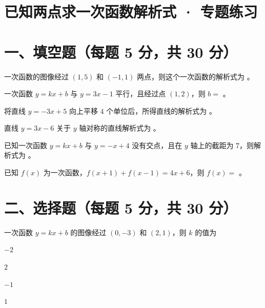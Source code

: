 \documentclass{exam-zh}
\begin{document}
\section*{已知两点求一次函数解析式 · 专题练习}

\section*{一、填空题（每题 5 分，共 30 分）}


\begin{question}[points=5]
  一次函数的图像经过 $(1, 5)$ 和 $(-1, 1)$ 两点，则这个一次函数的解析式为 \fillin。
  \fillin
\end{question}



\begin{question}[points=5]
  一次函数 $y = kx + b$ 与 $y = 3x - 1$ 平行，且经过点 $(1, 2)$，则 $b = $ \fillin。
  \fillin
\end{question}



\begin{question}[points=5]
  将直线 $y = -3x + 5$ 向上平移 $4$ 个单位后，所得直线的解析式为 \fillin。
  \fillin
\end{question}



\begin{question}[points=5]
  直线 $y = 3x - 6$ 关于 $y$ 轴对称的直线解析式为 \fillin。
  \fillin
\end{question}



\begin{question}[points=5]
  已知一次函数 $y = kx + b$ 与 $y = -x + 4$ 没有交点，且在 $y$ 轴上的截距为 $7$，则解析式为 \fillin。
  \fillin
\end{question}



\begin{question}[points=5]
  已知 $f(x)$ 为一次函数，$f(x + 1) + f(x - 1) = 4x + 6$，则 $f(x) = $ \fillin。
  \fillin
\end{question}


\section*{二、选择题（每题 5 分，共 30 分）}


\begin{question}[points=5]
  一次函数 $y = kx + b$ 的图像经过 $(0, -3)$ 和 $(2, 1)$，则 $k$ 的值为
  \begin{choices}
    \item $-2$
    \item $2$
    \item $-1$
    \item $1$
  \end{choices}
\end{question}
\end{document}
